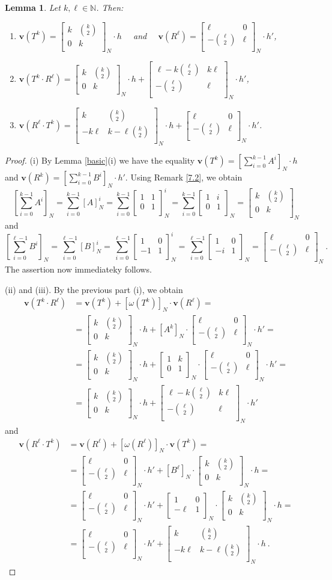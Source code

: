 \documentclass[10pt]{amsart}
\theoremstyle{plain}
\newtheorem{lemma}[theorem]{Lemma}
\theoremstyle{definition}
\theoremstyle{remark}%
\newcommand{\N}{\mathbb{N}}
\newcommand{\f}{\mathbf{v}}
\newcommand{\g}{\omega}
\newcommand{\matN}[4]{\left[\begin{array}{cc}
 #1 & #2\\
 #3 & #4\\
\end{array}\right]_N}
\begin{document}
\begin{lemma}\label{product}
Let $k,\ell\in\N$. Then:
\begin{enumerate}
 \item[(i)] $\f(T^k)=\matN{k}{{k\choose 2}}{0}{k}\cdot h$ \ \  and \ \ $\f(R^\ell)=\matN{\ell}{0}{-{\ell\choose 2}}{\ell}\cdot h'$,
 \item[(ii)] $\f(T^k\cdot R^\ell)= \matN{k}{{k\choose 2}}{0}{k}\cdot h+\matN{\ell-k{\ell\choose 2}}{k\ell}{-{\ell\choose 2}}{\ell}\cdot h'$,
 \item[(iii)] $\f(R^\ell\cdot T^k)=\matN{k}{{k\choose 2}}{-k\ell}{k-\ell{k\choose 2}}\cdot h+\matN{\ell}{0}{-{\ell\choose 2}}{\ell}\cdot h'$.
\end{enumerate}
\end{lemma}
\begin{proof}
(i) By Lemma \ref{basic}(i) we have the equality $\f(T^k)=\left[\sum_{i=0}^{k-1}A^i\right]_N\cdot h$ and $\f(R^k)=\left[\sum_{i=0}^{k-1}B^i\right]_N\cdot h'$. Using  Remark \ref{7.2}, we obtain $$\left[\sum_{i=0}^{k-1}A^i\right]_N=\sum_{i=0}^{k-1}\left[A\right]^i_N=\sum_{i=0}^{k-1}\matN{1}{1}{0}{1}^i=\sum_{i=0}^{k-1}\matN{1}{i}{0}{1}=\matN{k}{{k\choose 2}}{0}{k}$$ and
 $$\left[\sum_{i=0}^{\ell-1}B^i\right]_N=\sum_{i=0}^{\ell-1}\left[B\right]^i_N=\sum_{i=0}^{\ell-1}\matN{1}{0}{-1}{1}^i=\sum_{i=0}^{\ell-1}\matN{1}{0}{-i}{1}=\matN{\ell}{0}{-{\ell\choose 2}}{\ell} \ .$$
The assertion now immediateky follows.
 
(ii) and (iii).  By the previous part (i), we obtain
\begin{align*}
\f(T^k\cdot R^\ell)&=\f(T^k)+[\g(T^k)]_{N}\cdot\f(R^\ell)=\\
&=\matN{k}{{k\choose 2}}{0}{k}\cdot h+\left[A^k\right]_N\cdot\matN{\ell}{0}{-{\ell\choose 2}}{\ell}\cdot h'=\\
&=\matN{k}{{k\choose 2}}{0}{k}\cdot h+\matN{1}{k}{0}{1}\cdot\matN{\ell}{0}{-{\ell\choose 2}}{\ell}\cdot h'=\\
&=\matN{k}{{k\choose 2}}{0}{k}\cdot h+\matN{\ell-k{\ell\choose 2}}{k\ell}{-{\ell\choose 2}}{\ell}\cdot h'
\end{align*}
and
\begin{align*}
\f(R^\ell\cdot T^k)&=\f(R^{\ell})+[\g(R^{\ell})]_{N}\cdot\f(T^k)=\\
&=\matN{\ell}{0}{-{\ell\choose 2}}{\ell}\cdot h'+\left[B^\ell\right]_N\cdot\matN{k}{{k\choose 2}}{0}{k}\cdot h=\\
&=\matN{\ell}{0}{-{\ell\choose 2}}{\ell}\cdot h'+\matN{1}{0}{-\ell}{1}\cdot\matN{k}{{k\choose 2}}{0}{k}\cdot h=\\
&=\matN{\ell}{0}{-{\ell\choose 2}}{\ell}\cdot h'+\matN{k}{{k\choose 2}}{-k\ell}{k-\ell{k\choose 2}}\cdot h\ .
\end{align*}
\end{proof}
\end{document}
